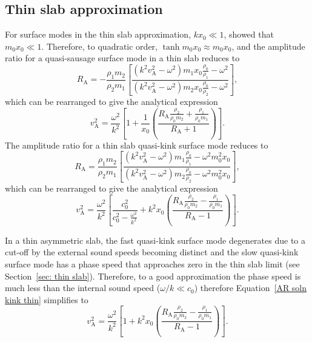 \subsection{Thin slab approximation} \label{sec: AR thin slab}
For surface modes in the thin slab approximation, $kx_0 \ll 1$, \cite{rob81b} showed that $m_0x_0 \ll 1$. Therefore, to quadratic order, $\tanh{m_0x_0} \approx m_0x_0$, and the amplitude ratio for a quasi-sausage surface mode in a thin slab reduces to
\begin{equation}
R_\textrm{A} = -\frac{\rho_1m_2}{\rho_2m_1}\left[\frac{(k^2v_\textrm{A}^2 - \omega^2)m_1x_0\frac{\rho_0}{\rho_1} - \omega^2}{(k^2v_\textrm{A}^2 - \omega^2)m_2x_0\frac{\rho_0}{\rho_2} - \omega^2}\right], 
\end{equation}
which can be rearranged to give the analytical expression
\begin{equation}
v_\textrm{A}^2 = \frac{\omega^2}{k^2} \left[1 + \frac{1}{x_0} \left(\frac{R_\textrm{A}\frac{\rho_2}{\rho_0m_2} + \frac{\rho_1}{\rho_0m_1}}{R_\textrm{A} + 1}\right)\right].
\end{equation}
The amplitude ratio for a thin slab quasi-kink surface mode reduces to
\begin{equation}
R_\textrm{A} = \frac{\rho_1m_2}{\rho_2m_1} \left[\frac{(k^2v_\textrm{A}^2 - \omega^2)m_1\frac{\rho_0}{\rho_1} - \omega^2m_0^2x_0}{(k^2v_\textrm{A}^2 - \omega^2)m_2\frac{\rho_0}{\rho_2} - \omega^2m_0^2x_0}\right], 
\end{equation}
which can be rearranged to give the analytical expression
\begin{equation}
v_\textrm{A}^2 = \frac{\omega^2}{k^2} \left[\frac{c_0^2}{c_0^2 - \frac{\omega^2}{k^2}} + k^2x_0\left(\frac{R_\textrm{A}\frac{\rho_2}{\rho_0m_2} - \frac{\rho_1}{\rho_0m_1}}{R_\textrm{A} - 1}\right)\right]. \label{AR soln kink thin}
\end{equation}

In a thin asymmetric slab, the fast quasi-kink surface mode degenerates due to a cut-off by the external sound speeds becoming distinct \citep{all_etal17} and the slow quasi-kink surface mode has a phase speed that approaches zero in the thin slab limit (see Section~\ref{sec: thin slab}). Therefore, to a good approximation the phase speed is much less than the internal sound speed ($\omega/k \ll c_0$) therefore Equation~\eqref{AR soln kink thin} simplifies to
\begin{equation}
v_\textrm{A}^2 = \frac{\omega^2}{k^2} \left[1 + k^2x_0\left(\frac{R_\textrm{A}\frac{\rho_2}{\rho_0m_2} - \frac{\rho_1}{\rho_0m_1}}{R_\textrm{A} - 1}\right)\right]. \label{AR soln kink thin simplified}
\end{equation}

